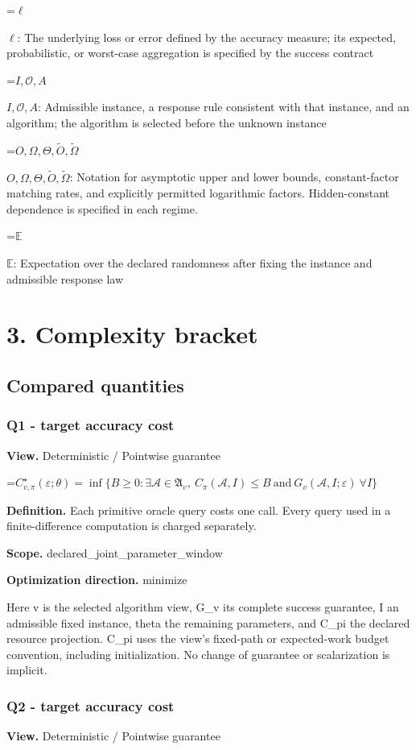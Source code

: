 \documentclass[10pt,a4paper]{article}
\newcommand{\AtlasMath}[1]{\par\begingroup\centering\setbox0=\hbox{$\displaystyle #1$}\ifdim\wd0>1.4\linewidth\typeout{ATLAS WIDE FORMULA: \the\wd0}\fi\ifdim\wd0>\linewidth\resizebox{\linewidth}{!}{\box0}\else\box0\fi\par\endgroup}
\newcommand{\AtlasInlineMath}[1]{\begingroup\setbox0=\hbox{$#1$}\ifdim\wd0>.4\linewidth\endgroup\AtlasMath{#1}\else\endgroup$#1$\fi}
\begin{document}
\AtlasInlineMath{\ell}: The underlying loss or error defined by the accuracy measure; its expected, probabilistic, or worst-case aggregation is specified by the success contract

\AtlasInlineMath{I,\mathcal{O},A}: Admissible instance, a response rule consistent with that instance, and an algorithm; the algorithm is selected before the unknown instance

\AtlasInlineMath{O,\Omega,\Theta,\widetilde{O},\widetilde\Omega}: Notation for asymptotic upper and lower bounds, constant-factor matching rates, and explicitly permitted logarithmic factors. Hidden-constant dependence is specified in each regime.

\AtlasInlineMath{\mathbb{E}}: Expectation over the declared randomness after fixing the instance and admissible response law

\section{3. Complexity bracket}
\subsection{Compared quantities}
\subsubsection{Q1 - target accuracy cost}
\textbf{View.} Deterministic / Pointwise guarantee

\AtlasMath{C^\star_{v,\pi}(\varepsilon;\theta)=\inf\{B\ge0:\exists\mathcal A\in\mathfrak A_v,\ C_\pi(\mathcal A,I)\le B\ \text{and}\ G_v(\mathcal A,I;\varepsilon)\ \forall I\}}
\textbf{Definition.} Each primitive oracle query costs one call. Every query used in a finite-difference computation is charged separately.

\textbf{Scope.} declared\_joint\_parameter\_window

\textbf{Optimization direction.} minimize

Here v is the selected algorithm view, G\_v its complete success guarantee, I an admissible fixed instance, theta the remaining parameters, and C\_pi the declared resource projection. C\_pi uses the view's fixed-path or expected-work budget convention, including initialization. No change of guarantee or scalarization is implicit.

\subsubsection{Q2 - target accuracy cost}
\textbf{View.} Deterministic / Pointwise guarantee
\end{document}
